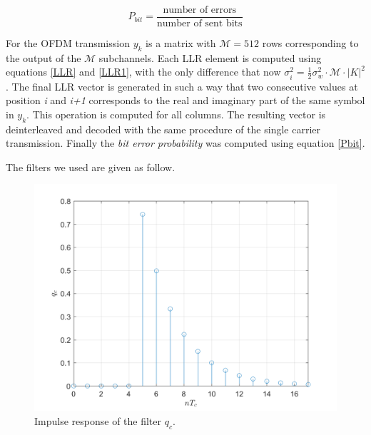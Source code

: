 \documentclass[a4paper, 12pt]{report}
\begin{document}
\begin{equation}\label{Pbit}
P_{bit} = \frac{\text{number of errors}}{\text{number of sent bits}}
\end{equation}

For the OFDM transmission $y_k$ is a matrix with $\mathcal{M}=512$ rows corresponding to the output of the $\mathcal{M}$ subchannels. Each LLR element is computed using equations \eqref{LLR} and \eqref{LLR1}, with the only difference that now $\sigma_i^2 = \frac{1}{2}\sigma_w^2 \cdot \mathcal{M} \cdot |K|^2 $. The final LLR vector is generated in such a way that two consecutive values at position \textit{i} and \textit{i+1} corresponds to the real and imaginary part of the same symbol in $y_k$. This operation is computed for all columns. The resulting vector is deinterleaved and decoded with the same procedure of the single carrier transmission. Finally the \textit{bit error probability} was computed using equation \eqref{Pbit}.

\clearpage
The filters we used are given as follow.

\begin{figure}[H]
	\centering
	\includegraphics[width=14cm]{qc}
	\caption{Impulse response of the filter $q_c$.}
\end{figure}
\end{document}
